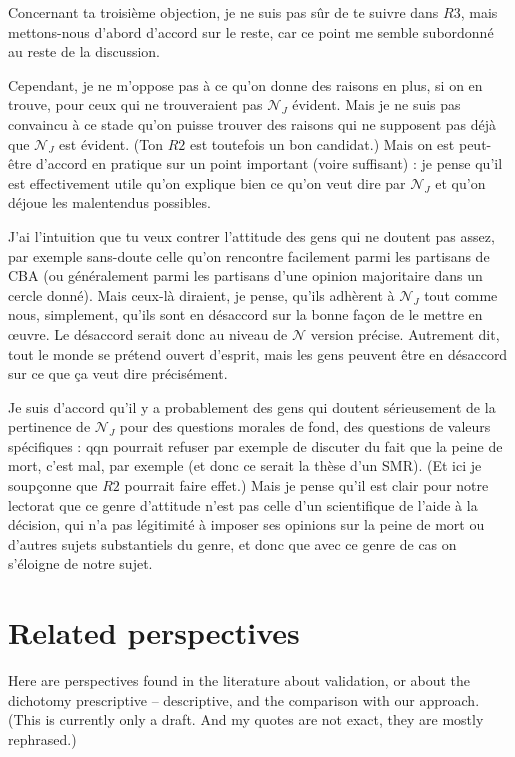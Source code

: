 \documentclass[preprint, french, english, 11pt, authoryear]{elsarticle}%
\newcommand{\adv}{\mathscr{N}}
\newcommand{\fadv}{\mathscr{N}_J}%
\begin{document}
Concernant ta troisième objection, je ne suis pas sûr de te suivre dans $R3$, mais mettons-nous d’abord d’accord sur le reste, car ce point me semble subordonné au reste de la discussion.

Cependant, je ne m’oppose pas à ce qu’on donne des raisons en plus, si on en trouve, pour ceux qui ne trouveraient pas $\fadv$ évident. Mais je ne suis pas convaincu à ce stade qu’on puisse trouver des raisons qui ne supposent pas déjà que $\fadv$ est évident. (Ton $R2$ est toutefois un bon candidat.) Mais on est peut-être d’accord en pratique sur un point important (voire suffisant) : je pense qu’il est effectivement utile qu’on explique bien ce qu’on veut dire par $\fadv$ et qu’on déjoue les malentendus possibles.

J’ai l’intuition que tu veux contrer l’attitude des gens qui ne doutent pas assez, par exemple sans-doute celle qu’on rencontre facilement parmi les partisans de CBA (ou généralement parmi les partisans d’une opinion majoritaire dans un cercle donné). Mais ceux-là diraient, je pense, qu’ils adhèrent à $\fadv$ tout comme nous, simplement, qu’ils sont en désaccord sur la bonne façon de le mettre en œuvre. Le désaccord serait donc au niveau de $\adv$ version précise. Autrement dit, tout le monde se prétend ouvert d’esprit, mais les gens peuvent être en désaccord sur ce que ça veut dire précisément.

Je suis d’accord qu’il y a probablement des gens qui doutent sérieusement de la pertinence de $\fadv$ pour des questions morales de fond, des questions de valeurs spécifiques : qqn pourrait refuser par exemple de discuter du fait que la peine de mort, c’est mal, par exemple (et donc ce serait la thèse d’un SMR). (Et ici je soupçonne que $R2$ pourrait faire effet.) Mais je pense qu’il est clair pour notre lectorat que ce genre d’attitude n’est pas celle d’un scientifique de l’aide à la décision, qui n’a pas légitimité à imposer ses opinions sur la peine de mort ou d’autres sujets substantiels du genre, et donc que avec ce genre de cas on s’éloigne de notre sujet.


\section{Related perspectives}
\label{sec-related}
Here are perspectives found in the literature about validation, or about the dichotomy prescriptive – descriptive, and the comparison with our approach. (This is currently only a draft. And my quotes are not exact, they are mostly rephrased.)
\end{document}
